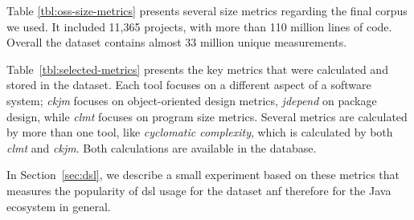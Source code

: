 \documentclass{sig-alternate}
\begin{document}
Table \ref{tbl:oss-size-metrics} presents several size metrics regarding the final corpus we used. It included 11,365 projects, with more than 110 million lines of code. Overall the dataset contains almost 33 million unique measurements.

Table~\ref{tbl:selected-metrics} presents the key metrics that were calculated and stored in the dataset. Each tool focuses on a different aspect of a software system; \textit{ckjm} focuses on object-oriented design metrics, \textit{jdepend} on package design, while \textit{clmt} focuses on program size metrics. Several metrics are calculated by more than one tool, like \textit{cyclomatic complexity}, which is calculated by both \textit{clmt} and \textit{ckjm}. Both calculations are available in the database.


In Section~\ref{sec:dsl}, we describe a small experiment based on these metrics that measures the popularity of {\sc dsl} usage for the dataset anf therefore for the Java ecosystem in general.
\end{document}
